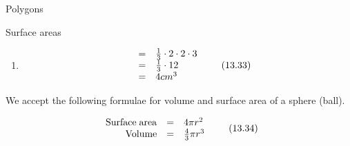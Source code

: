 \begin{exercises}{Polygons}
\begin{exercises}{Surface areas }
{\begin{mdframed}[linewidth=4, leftmargin=40, rightmargin=40]
\begin{exercise}
\begin{enumerate}[noitemsep, label=\textbf{Step} \textbf{\arabic*}. ]
    \begin{equation}
    V=\frac{1}{3}A\ensuremath{\cdot}h,\tag{13.31}
      \end{equation}
    
      
      \label{m39357*id63518}where $A$ is the area of the base and $h$ is the height of the pyramid. For a square base this means\par 
      \label{m39357*id63540}\nopagebreak\noindent{}
        
    \begin{equation}
    V=\frac{1}{3}a\ensuremath{\cdot}a\ensuremath{\cdot}h\tag{13.32}
      \end{equation}
    
      
      \label{m39357*id63570}where $a$ is the length of the side of the square base.\par 
      \item  
      \label{m39357*id63597}\nopagebreak\noindent{}
        
    \begin{equation}
    \begin{array}{ccc}& =& \frac{1}{3}\ensuremath{\cdot}2\ensuremath{\cdot}2\ensuremath{\cdot}3\hfill \\ & =& \frac{1}{3}\ensuremath{\cdot}12\hfill \\ & =& 4c{m}^{3}\hfill \end{array}\tag{13.33}
      \end{equation}
    
      
      
      \end{enumerate}
         

    \end{exercise}
    \end{mdframed}
    }
    \noindent
  
      \label{m39357*id63694}We accept the following formulae for volume and surface area of a sphere (ball).\par 
      \label{m39357*id63698}\nopagebreak\noindent{}
        
    \begin{equation}
    \begin{array}{ccc}\hfill \mathrm{Surface\; area}& =& 4\pi {r}^{2}\hfill \\ \hfill \mathrm{Volume}& =& \frac{4}{3}\pi {r}^{3}\hfill \end{array}\tag{13.34}
      \end{equation}
    
      
\par
            \label{m39357*eip-219}\vspace{.5cm} 
      

\end{exercises}
\end{exercises}
